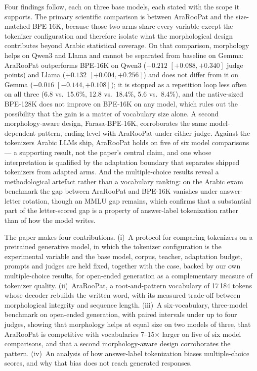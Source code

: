 \documentclass[a4paper,fleqn]{cas-sc}
\begin{document}
Four findings follow, each on three base models, each stated with the scope it supports. The primary scientific comparison is between AraRooPat and the size-matched BPE-16K, because those two arms share every variable except the tokenizer configuration and therefore isolate what the morphological design contributes beyond Arabic statistical coverage. On that comparison, morphology helps on Qwen3 and Llama and cannot be separated from baseline on Gemma: AraRooPat outperforms BPE-16K on Qwen3 ($+0.212$ $[+0.088,+0.340]$ judge points) and Llama ($+0.132$ $[+0.004,+0.256]$) and does not differ from it on Gemma ($-0.016$ $[-0.144,+0.108]$); it is stopped as a repetition loop less often on all three (6.8 vs.\ 15.6\%, 12.8 vs.\ 18.4\%, 5.6 vs.\ 8.4\%), and the native-sized BPE-128K does not improve on BPE-16K on any model, which rules out the possibility that the gain is a matter of vocabulary size alone. A second morphology-aware design, Farasa-BPE-16K, corroborates the same model-dependent pattern, ending level with AraRooPat under either judge. Against the tokenizers Arabic LLMs ship, AraRooPat holds on five of six model comparisons --- a supporting result, not the paper's central claim, and one whose interpretation is qualified by the adaptation boundary that separates shipped tokenizers from adapted arms. And the multiple-choice results reveal a methodological artefact rather than a vocabulary ranking: on the Arabic exam benchmark the gap between AraRooPat and BPE-16K vanishes under answer-letter rotation, though an MMLU gap remains, which confirms that a substantial part of the letter-scored gap is a property of answer-label tokenization rather than of how the model writes.

The paper makes four contributions. (i)~A protocol for comparing tokenizers on a pretrained generative model, in which the tokenizer configuration is the experimental variable and the base model, corpus, teacher, adaptation budget, prompts and judges are held fixed, together with the case, backed by our own multiple-choice results, for open-ended generation as a complementary measure of tokenizer quality. (ii)~AraRooPat, a root-and-pattern vocabulary of 17\,184 tokens whose decoder rebuilds the written word, with its measured trade-off between morphological integrity and sequence length. (iii)~A six-vocabulary, three-model benchmark on open-ended generation, with paired intervals under up to four judges, showing that morphology helps at equal size on two models of three, that AraRooPat is competitive with vocabularies 7--15$\times$ larger on five of six model comparisons, and that a second morphology-aware design corroborates the pattern. (iv)~An analysis of how answer-label tokenization biases multiple-choice scores, and why that bias does not reach generated responses.
\end{document}
